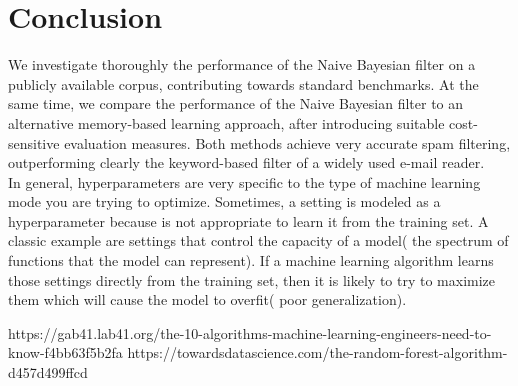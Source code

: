 \documentclass[journal]{IEEEtran}
\begin{document}
\section{Conclusion}
We investigate thoroughly the performance of the Naive Bayesian filter on a publicly available corpus, contributing towards standard benchmarks. At the same time, we compare the performance of the Naive Bayesian filter to an alternative memory-based learning approach, after introducing suitable cost-sensitive evaluation measures. Both methods achieve very accurate spam filtering, outperforming clearly the keyword-based filter of a widely used e-mail reader.\\
 In general, hyperparameters are very specific to the type of machine learning mode you are trying to optimize. Sometimes, a setting is modeled as a hyperparameter because is not appropriate to learn it from the training set. A classic example are settings that control the capacity of a model( the spectrum of functions that the model can represent). If a machine learning algorithm learns those settings directly from the training set, then it is likely to try to maximize them which will cause the model to overfit( poor generalization).


\begin{thebibliography}{1}
https://gab41.lab41.org/the-10-algorithms-machine-learning-engineers-need-to-know-f4bb63f5b2fa
https://towardsdatascience.com/the-random-forest-algorithm-d457d499ffcd
\end{thebibliography}
\end{document}
